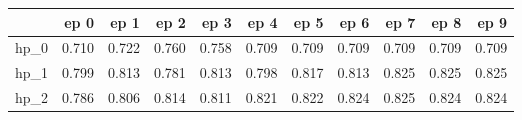 \begin{tabular}{lrrrrrrrrrr}
\toprule
{} &   ep 0 &   ep 1 &   ep 2 &   ep 3 &   ep 4 &   ep 5 &   ep 6 &   ep 7 &   ep 8 &   ep 9 \\
\midrule
hp\_0 &  0.710 &  0.722 &  0.760 &  0.758 &  0.709 &  0.709 &  0.709 &  0.709 &  0.709 &  0.709 \\
hp\_1 &  0.799 &  0.813 &  0.781 &  0.813 &  0.798 &  0.817 &  0.813 &  0.825 &  0.825 &  0.825 \\
hp\_2 &  0.786 &  0.806 &  0.814 &  0.811 &  0.821 &  0.822 &  0.824 &  0.825 &  0.824 &  0.824 \\
\bottomrule
\end{tabular}
